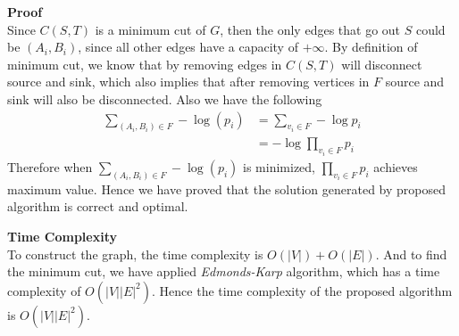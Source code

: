 \documentclass{article}
\newcommand{\Complexity}{\vspace{0.3cm} \noindent\textbf{Time Complexity} \\}
\newcommand{\Proof}{\vspace{0.3cm} \noindent\textbf{Proof} \\}
\begin{document}
\Proof
Since $C(S, T)$ is a minimum cut of $G$, then the only edges that go out $S$ could be $(A_i,
B_i)$, since all other edges have a capacity of $+\infty$. By definition of minimum cut, we know that
by removing edges in $C(S, T)$ will disconnect source and sink, which also implies that after
removing vertices in $F$ source and sink will also be disconnected. Also we have the following
\begin{align}
  \sum_{(A_i, B_i) \in F} -\log(p_i) &= \sum_{v_i \in F} -\log p_i \\
  & = -\log\prod_{v_i \in F} p_i
\end{align}
Therefore when $\sum_{(A_i, B_i) \in F} -\log(p_i)$ is minimized, $\prod_{v_i \in F} p_i$ achieves
maximum value. Hence we have proved that the solution generated by proposed algorithm is correct and
optimal.

\Complexity
To construct the graph, the time complexity is $O(|V|) + O(|E|)$. And to find the minimum cut, we
have applied \textit{Edmonds-Karp} algorithm, which has a time complexity of $O(|V||E|^2)$. Hence
the time complexity of the proposed algorithm is $O(|V||E|^2)$.
\end{document}
